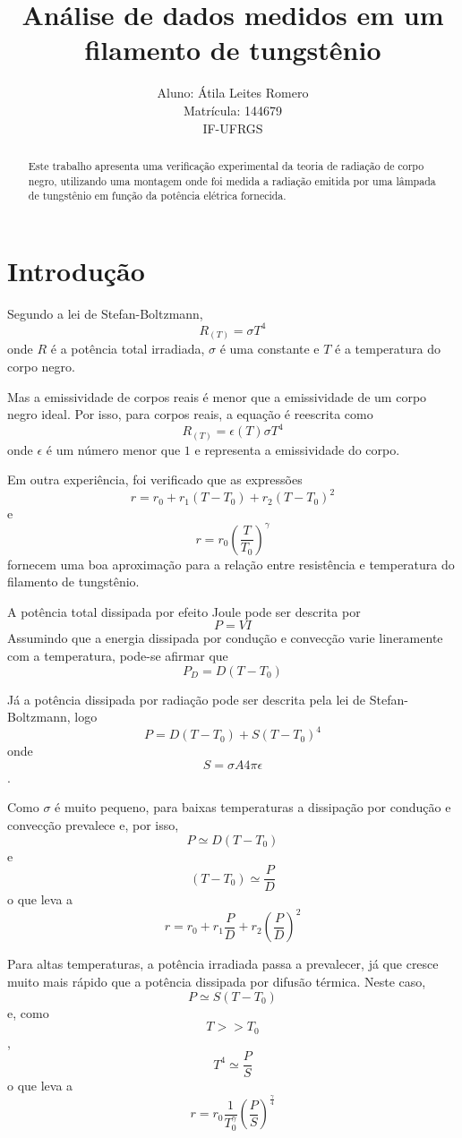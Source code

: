 \documentclass[brazilian,12pt,a4paper,twocolumn,final]{article}
\title{Análise de dados medidos em um filamento de tungstênio}
\author{Aluno: Átila Leites Romero \\ Matrícula: 144679 \\ IF-UFRGS}
\begin{document}
\maketitle

\begin{abstract}
Este trabalho apresenta uma verificação experimental da teoria de radiação de corpo negro, 
utilizando uma montagem onde foi medida a radiação emitida por uma lâmpada de tungstênio 
em função da potência elétrica fornecida.
\end{abstract}

\section{Introdução}
Segundo a lei de Stefan-Boltzmann,
$$ R_{(T)}=\sigma T^4$$
onde $R$ é a potência total irradiada, $\sigma$ é uma constante 
e $T$ é a temperatura do corpo negro. 

Mas a emissividade de corpos reais é menor que a emissividade de um corpo negro ideal.
Por isso, para corpos reais, a equação é reescrita como 
$$ R_{(T)}=\epsilon(T)\sigma T^4$$
onde $\epsilon$ é um número menor que $1$ e representa a emissividade do corpo.

Em outra experiência, foi verificado que as expressões
$$r=r_0+r_1(T-T_0)+r_2(T-T_0)^2$$ 
e 
$$r=r_0(\frac{T}{T_0})^\gamma$$
fornecem uma boa aproximação para a
relação entre resistência e temperatura do filamento de tungstênio.

A potência total dissipada por efeito Joule pode ser descrita por 
$$P=VI$$ 
Assumindo que a energia dissipada por condução e convecção varie lineramente 
com a temperatura, pode-se afirmar que 
$$P_D=D(T-T_0)$$

Já a potência dissipada por radiação pode ser descrita pela lei de Stefan-Boltzmann, 
logo 
$$P=D(T-T_0)+S(T-T_0)^4$$
onde 
$$S=\sigma A 4\pi\epsilon$$.

Como $\sigma$ é muito pequeno, 
para baixas temperaturas a dissipação por condução e convecção prevalece e,
por isso, 
$$P\simeq D(T-T_0)$$ 
e 
$$(T-T_0)\simeq \frac{P}{D}$$
o que leva a 
$$r=r_0+r_1\frac{P}{D}+r_2(\frac{P}{D})^2$$

Para altas temperaturas, a potência irradiada passa a prevalecer, 
já que cresce muito mais rápido que a potência dissipada por difusão térmica.
Neste caso,  
$$P\simeq S(T-T_0)$$ 
e, como 
$$T>>T_0$$, 
$$T^4\simeq \frac{P}{S}$$
o que leva a 
$$r=r_0\frac{1}{T_0^\gamma}(\frac{P}{S})^\frac{\gamma}{4}$$
\end{document}
